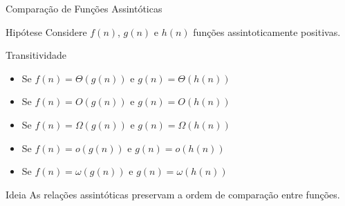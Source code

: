 \documentclass{beamer}
\begin{document}
\begin{frame}{Comparação de Funções Assintóticas}

\begin{block}{Hipótese}
Considere $f(n)$, $g(n)$ e $h(n)$ funções assintoticamente positivas.
\end{block}

\vspace{0.2cm}

\begin{block}{Transitividade}
\begin{itemize}
    \item Se $f(n) = \Theta(g(n))$ e $g(n) = \Theta(h(n))$
    \item Se $f(n) = O(g(n))$ e $g(n) = O(h(n))$
    \item Se $f(n) = \Omega(g(n))$ e $g(n) = \Omega(h(n))$
    \item Se $f(n) = o(g(n))$ e $g(n) = o(h(n))$
    \item Se $f(n) = \omega(g(n))$ e $g(n) = \omega(h(n))$
\end{itemize}
\end{block}

\vspace{0.2cm}

\begin{alertblock}{Ideia}
As relações assintóticas preservam a ordem de comparação entre funções.
\end{alertblock}

\end{frame}
\end{document}
